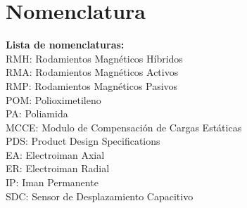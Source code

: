 \chapter{Nomenclatura}

\textbf{Lista de nomenclaturas:}\\
RMH:	Rodamientos Magn\'eticos H\'ibridos\\ 
RMA: 	Rodamientos Magn\'eticos Activos\\
RMP: 	Rodamientos Magn\'eticos Pasivos\\
POM:	Polioximetileno \\
PA:		Poliamida\\
MCCE:	Modulo de Compensaci\'on de Cargas Est\'aticas\\
PDS:	Product Design Specifications\\ 
EA:		Electroiman Axial\\
ER:		Electroiman Radial\\
IP:		Iman Permanente\\
SDC:	Sensor de Desplazamiento Capacitivo\\ 
